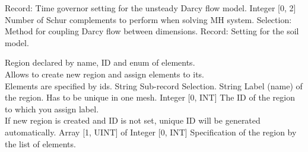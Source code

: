 \begin{RecordType}
			{{Record}{: }}
			{\textlangle{ \it{{\{}{\}}} }\textrangle}
			{} %
			{{{Time governor setting for the unsteady Darcy flow model.}}}
		\KeyItem
			{}
			{{Integer [0, 2]}}
			{\textrangle}
			{} %
			{{{Number of Schur complements to perform when solving MH system.}}}
		\KeyItem
			{}
			{{Selection}{: }}
			{\textrangle}
			{} %
			{{{Method for coupling Darcy flow between dimensions.}}}
		\KeyItem
			{}
			{{Record}{: }}
			{\textrangle}
			{} %
			{{{Setting for the soil model.}}}
\end{RecordType}
\begin{RecordType}
	{}
	{} %
	{} %
	{} %
	{{{Region declared by name, ID and enum of elements.}\\{
Allows to create new region and assign elements to its.}\\{
Elements are specified by ids.}}}
		\KeyItem
			{}
			{{String}}
			{\textrangle}
			{} %
			{{{Sub-record Selection.}}}
		\KeyItem
			{}
			{{String}}
			{\textrangle}
			{} %
			{{{Label (name) of the region. Has to be unique in one mesh.}}}
		\KeyItem
			{}
			{{Integer [0, INT]}}
			{\textrangle}
			{} %
			{{{The ID of the region to which you assign label.}\\{
If new region is created and ID is not set, unique ID will be generated automatically.}}}
		\KeyItem
			{}
			{{Array [1, UINT] of }{Integer [0, INT]}}
			{\textrangle}
			{} %
			{{{Specification of the region by the list of elements.}}}
\end{RecordType}
